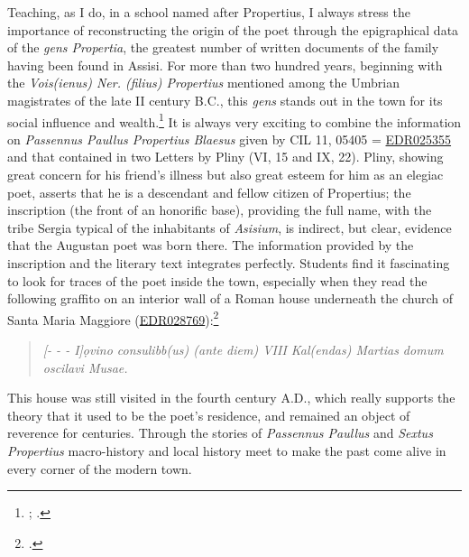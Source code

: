 \documentclass[amsthm,ebook]{saparticle}
\begin{document}
Teaching, as I do, in a school named after Propertius, I always stress the importance of reconstructing the origin of
the poet through the epigraphical data of the \emph{gens Propertia}, the greatest number of written documents of the family
having been found in Assisi. For more than two hundred years, beginning with the \emph{Vois(ienus) Ner. (filius) Propertius}
mentioned among the Umbrian magistrates of the late II century B.C., this \emph{gens} stands out in the town for its social
influence and wealth.\footnote{\citet{Forni1986}; \citet{Zuddas2006}.} It is always very exciting to combine the information on
\emph{Passennus Paullus Propertius Blaesus }given by CIL 11, 05405 = \href{http://www.edr-edr.it/edr\_programmi/res\_complex\_comune.php?do=book\&id\_nr=EDR025355}{EDR025355} and that contained in two Letters by Pliny (VI,
15 and IX, 22). Pliny, showing great concern for his friend’s illness but also great esteem for him as an elegiac poet,
asserts that he is a descendant and fellow citizen of Propertius; the inscription (the front of an honorific base),
providing the full name, with the tribe Sergia typical of the inhabitants of \emph{Asisium}, is indirect, but clear, evidence
that the Augustan poet was born there. The information provided by the inscription and the literary text integrates
perfectly. Students find it fascinating to look for traces of the poet inside the town, especially when they read the
following graffito on an interior wall of a Roman house underneath the church of Santa Maria Maggiore (\href{http://www.edr-edr.it/edr\_programmi/res\_complex\_comune.php?do=book\&id\_nr=EDR028769}{EDR028769}):\footnote{\citet[244-246]{Boldrighini2014}.}

\begin{quotation}

\emph{[{}- - - I]ọvino consulibb(us) (ante diem) VIII Kal(endas) Martias domum oscilavi Musae.}
\end{quotation}

This house was still visited in the fourth century A.D., which really supports the theory that it used to be the poet’s
residence, and remained an object of reverence for centuries. Through the stories
of \emph{Passennus Paullus} and \emph{Sextus Propertius} macro-history and local history meet to make the past come alive in every
corner of the modern town.



\end{document}
